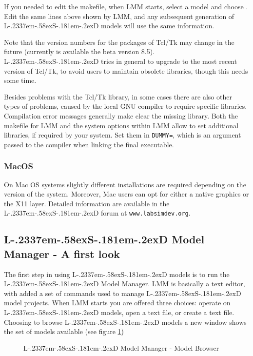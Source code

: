 \documentclass [11pt,a4paper] {book}
\def\LsD{{L\kern-.2337em\lower-.58ex\hbox{S}\kern-.181em\lower-.2ex\hbox{D}}\xspace}
\begin{document}
If you needed to edit the makefile, when LMM starts, select a model and choose . Edit the same lines above shown by LMM, and any subsequent generation of \LsD models will use the same information.

Note that the version numbers for the packages of Tcl/Tk may change in the future (currently is available the beta version 8.5). \LsD tries in general to upgrade to the most recent version of Tcl/Tk, to avoid users to maintain obsolete libraries, though this needs some time.

Besides problems with the Tcl/Tk library, in some cases there are also other types of problems, caused by the local GNU compiler to require specific libraries. Compilation error messages generally make clear the missing library. Both the makefile for LMM and the system options within LMM allow to set additional libraries, if required by your system. Set them in \texttt{DUMMY=}, which is an argument passed to the compiler when linking the final executable. 

\subsubsection{MacOS}
On Mac OS systems slightly different installations are required depending on the version of the system. Moreover, Mac users can opt for either a native graphics or the X11 layer. Detailed information are available in the \LsD forum at \texttt{www.labsimdev.org}.


\subsection{\LsD Model Manager - A first look}
The first step in using \LsD models is to run the \LsD Model Manager. LMM is basically a
text editor, with added a set of commands used to manage \LsD model projects. When LMM
starts you are offered three choices: operate on \LsD models, open a text file, or create
a text file. Choosing to browse \LsD models a new window shows the set of models available
(see figure \ref{fig:LMMbrowser})


\begin{figure}[ht]
  \centering
  \caption{\LsD Model Manager - Model Browser}
  \label{fig:LMMbrowser}
\end{figure}
\end{document}
